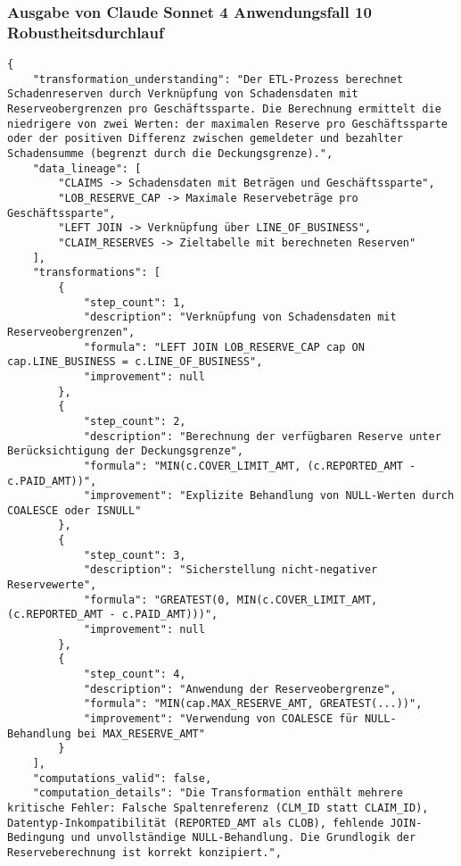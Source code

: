 \subsubsection{Ausgabe von Claude Sonnet 4 Anwendungsfall 10 Robustheitsdurchlauf}\label{anhang:subsubsec:claude_case10_prompt3}
\begin{lstlisting}[caption={Ausgabe: Claude Sonnet 4 Anwendungsfall 10 Robustheitsdurchlauf},label={claude_case10_prompt3}]
{
    "transformation_understanding": "Der ETL-Prozess berechnet Schadenreserven durch Verknüpfung von Schadensdaten mit Reserveobergrenzen pro Geschäftssparte. Die Berechnung ermittelt die niedrigere von zwei Werten: der maximalen Reserve pro Geschäftssparte oder der positiven Differenz zwischen gemeldeter und bezahlter Schadensumme (begrenzt durch die Deckungsgrenze).",
    "data_lineage": [
        "CLAIMS -> Schadensdaten mit Beträgen und Geschäftssparte",
        "LOB_RESERVE_CAP -> Maximale Reservebeträge pro Geschäftssparte",
        "LEFT JOIN -> Verknüpfung über LINE_OF_BUSINESS",
        "CLAIM_RESERVES -> Zieltabelle mit berechneten Reserven"
    ],
    "transformations": [
        {
            "step_count": 1,
            "description": "Verknüpfung von Schadensdaten mit Reserveobergrenzen",
            "formula": "LEFT JOIN LOB_RESERVE_CAP cap ON cap.LINE_BUSINESS = c.LINE_OF_BUSINESS",
            "improvement": null
        },
        {
            "step_count": 2,
            "description": "Berechnung der verfügbaren Reserve unter Berücksichtigung der Deckungsgrenze",
            "formula": "MIN(c.COVER_LIMIT_AMT, (c.REPORTED_AMT - c.PAID_AMT))",
            "improvement": "Explizite Behandlung von NULL-Werten durch COALESCE oder ISNULL"
        },
        {
            "step_count": 3,
            "description": "Sicherstellung nicht-negativer Reservewerte",
            "formula": "GREATEST(0, MIN(c.COVER_LIMIT_AMT, (c.REPORTED_AMT - c.PAID_AMT)))",
            "improvement": null
        },
        {
            "step_count": 4,
            "description": "Anwendung der Reserveobergrenze",
            "formula": "MIN(cap.MAX_RESERVE_AMT, GREATEST(...))",
            "improvement": "Verwendung von COALESCE für NULL-Behandlung bei MAX_RESERVE_AMT"
        }
    ],
    "computations_valid": false,
    "computation_details": "Die Transformation enthält mehrere kritische Fehler: Falsche Spaltenreferenz (CLM_ID statt CLAIM_ID), Datentyp-Inkompatibilität (REPORTED_AMT als CLOB), fehlende JOIN-Bedingung und unvollständige NULL-Behandlung. Die Grundlogik der Reserveberechnung ist korrekt konzipiert.",

\end{lstlisting}
